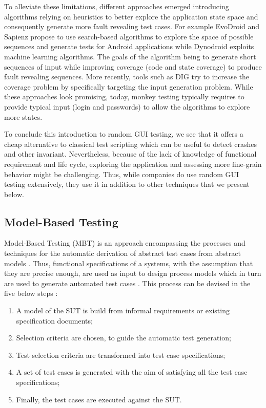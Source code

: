 To alleviate these limitations, different approaches emerged introducing algorithms relying on heuristics to better explore the application state space and consequently generate more fault revealing test cases. For example EvoDroid \cite{Mahmood2014} and Sapienz \cite{Mao2016} propose to use search-based algorithms to explore the space of possible sequences and generate tests for Android applications while Dynodroid \cite{Machiry2013} exploits machine learning algorithms. The goals of the algorithm being to generate short sequences of input while improving coverage (code and state coverage) to produce fault revealing sequences. More recently, tools such as DIG \cite{Biagiola2019} try to increase the coverage problem by specifically targeting the input generation problem. While these approaches look promising, today, monkey testing typically requires to provide typical input (\eg login and passwords) to allow the algorithms to explore more states.

To conclude this introduction to random GUI testing, we see that it offers a cheap alternative to classical test scripting which can be useful to detect crashes and other invariant. Nevertheless, because of the lack of knowledge of functional requirement and life cycle, exploring the application and assessing more fine-grain behavior might be challenging. Thus, while companies do use random GUI testing extensively, they use it in addition to other techniques that we present below.

\subsection{Model-Based Testing}
\label{sec:introduction-model-based-testing}

Model-Based Testing (MBT) is an approach encompassing the processes and techniques for the automatic derivation of abstract test cases from abstract models \cite{Utting2012}. Thus, functional specifications of a systems, with the assumption that they are precise enough, are used as input to design process models which in turn are used to generate automated test cases \cite{Gupta2011}. This process can be devised in the five below steps \cite{Utting2012}:

\begin{enumerate}
    \item A model of the SUT is build from informal requirements or existing specification documents;
    \item Selection criteria are chosen, to guide the automatic test generation;
    \item Test selection criteria are transformed into test case specifications;
    \item A set of test cases is generated with the aim of satisfying all the test case specifications;
    \item Finally, the test cases are executed against the SUT.
\end{enumerate}

